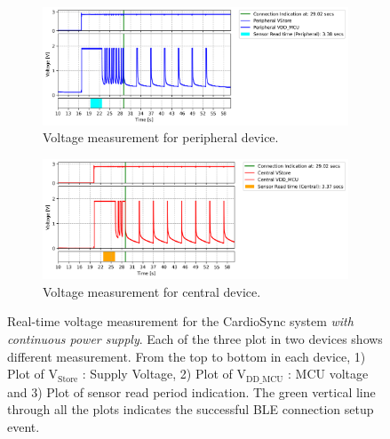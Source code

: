 \begin{figure}[ht]
    \begin{subfigure}{1\linewidth}
        \centering
        \includegraphics[width=1\linewidth]{chapters/Results/Connection_cardiosync_continous_peripheral.png}
        \caption{Voltage measurement for peripheral device.}
        \label{fig:continous_connection_cardiosync_peripheral}
        \vspace{1\baselineskip}
    \end{subfigure}
    \begin{subfigure}{1\linewidth}
        \centering
        \includegraphics[width=1\linewidth]{chapters/Results/Connection_cardiosync_continous_central.png}
        \caption{Voltage measurement for central device.}
        \label{fig:continous_connection_cardiosync_central}
    \end{subfigure}
    \caption{Real-time voltage measurement for the CardioSync system \textit{with continuous power supply}. Each of the three plot in two devices shows different measurement. From the top to bottom in each device, 1) Plot of \(\text{V}_\text{Store}\) : Supply Voltage, 2) Plot of \(\text{V}_\text{DD\_MCU}\) : MCU voltage and 3) Plot of sensor read period indication. The green vertical line through all the plots indicates the successful BLE connection setup event.}
    \label{fig:continous_connection_cardiosync}
\end{figure}

